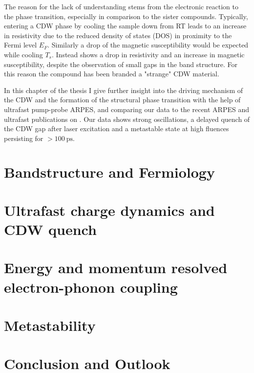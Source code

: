The reason for the lack of understanding stems from the electronic reaction to the phase transition, especially in comparison to the  sister compounds.
Typically, entering a CDW phase by cooling the sample down from RT leads to an increase in resistivity due to the reduced density of states (DOS) in proximity to the Fermi level $E_F$.
Similarly a drop of the magnetic susceptibility would be expected while cooling $T_s$.
Instead  shows a drop in resistivity and an increase in magnetic susceptibility, despite the observation of small gaps in the band structure.
For this reason the compound has been branded a "strange" CDW material.

In this chapter of the thesis I give further insight into the driving mechanism of the CDW and the formation of the structural phase transition with the help of ultrafast pump-probe ARPES, and comparing our data to the recent ARPES and ultrafast publications on .
Our data shows strong oscillations, a delayed quench of the CDW gap after laser excitation and a metastable state at high fluences persisting for $>\SI{100}{\pico\second}$.

\section{Bandstructure and Fermiology}


\section{Ultrafast charge dynamics and CDW quench}


\section{Energy and momentum resolved electron-phonon coupling}


\section{Metastability}


\section{Conclusion and Outlook}
